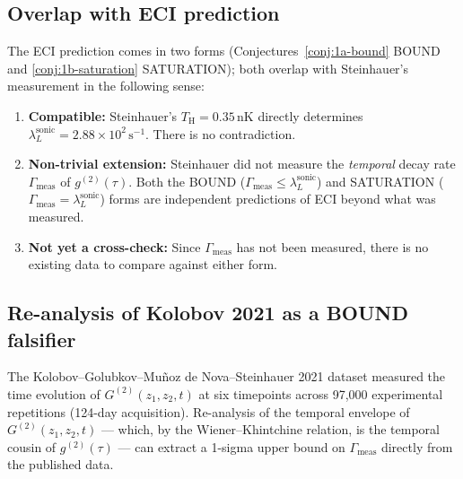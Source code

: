 \documentclass[12pt,a4paper]{article}
\renewcommand{\TH}{T_{\mathrm{H}}}
\newcommand{\lambdaL}{\lambda_L^{\mathrm{sonic}}}
\begin{document}
\subsection{Overlap with ECI prediction}

The ECI prediction comes in two forms
(Conjectures~\ref{conj:1a-bound} BOUND and
\ref{conj:1b-saturation} SATURATION); both overlap with Steinhauer's
measurement in the following sense:
\begin{enumerate}
  \item \textbf{Compatible:} Steinhauer's $\TH = 0.35\,\mathrm{nK}$
    directly determines $\lambdaL = 2.88 \times 10^2\,\mathrm{s}^{-1}$.
    There is no contradiction.
  \item \textbf{Non-trivial extension:} Steinhauer did not measure the
    \emph{temporal} decay rate $\Gamma_{\mathrm{meas}}$ of
    $g^{(2)}(\tau)$.  Both the BOUND
    ($\Gamma_{\mathrm{meas}} \leq \lambdaL$) and SATURATION
    ($\Gamma_{\mathrm{meas}} = \lambdaL$) forms are independent
    predictions of ECI beyond what was measured.
  \item \textbf{Not yet a cross-check:} Since $\Gamma_{\mathrm{meas}}$
    has not been measured, there is no existing data to compare
    against either form.
\end{enumerate}

\subsection{Re-analysis of Kolobov 2021 as a BOUND falsifier}
\label{sec:kolobov-reanalysis}

The Kolobov--Golubkov--Mu\~noz de Nova--Steinhauer 2021 dataset
\cite{kolobov2021} measured the time evolution of $G^{(2)}(z_1, z_2, t)$
at six timepoints across 97{,}000 experimental repetitions
(124-day acquisition).  Re-analysis of the temporal envelope of
$G^{(2)}(z_1, z_2, t)$ — which, by the Wiener--Khintchine relation, is
the temporal cousin of $g^{(2)}(\tau)$ — can extract a 1-sigma upper
bound on $\Gamma_{\mathrm{meas}}$ directly from the published data.
\end{document}
